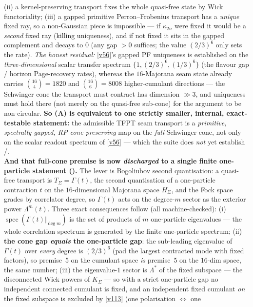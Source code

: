 \documentclass[11pt,a4paper]{article}
\begin{document}
\begin{keybox}
(ii) a kernel-preserving transport fixes the whole quasi-free state by Wick functoriality; (iii) a gapped
primitive Perron--Frobenius transport has a \emph{unique} fixed ray, so a non-Gaussian piece is impossible
--- if $\kappa_{2n}$ were fixed it would be a \emph{second} fixed ray (killing uniqueness), and if not
fixed it sits in the gapped complement and decays to $0$ (any gap $>0$ suffices; the value $(2/3)^6$ only
sets the rate). \emph{The honest residual:} \vref{v56}'s gapped PF uniqueness is established on the
\emph{three-dimensional} scalar transfer spectrum $\{1,(2/3)^6,(1/3)^6\}$ (the flavour gap / horizon
Page-recovery rates), whereas the $16$-Majorana seam state already carries $\binom{16}{4}{=}1820$ and
$\binom{16}{6}{=}8008$ higher-cumulant directions --- the Schwinger cone the transport must contract has
dimension $\gg3$, and uniqueness must hold there (not merely on the quasi-free sub-cone) for the argument
to be non-circular. \textbf{So (A) is equivalent to one strictly smaller, internal, exact-testable
statement:} the admissible TFPT seam transport is a \emph{primitive, spectrally gapped, RP-cone-preserving}
map on the \emph{full} Schwinger cone, not only on the scalar readout spectrum of \vref{v56} --- which the
suite does \emph{not} yet establish \mE/\mO.
\smallskip\\
\noindent\textbf{And that full-cone premise is now \emph{discharged} to a single finite one-particle
statement ().} The lever is Bogoliubov second quantisation: a
quasi-free transport is $T_\Sigma=\Gamma(t)$, the second quantisation of a one-particle contraction $t$ on
the $16$-dimensional Majorana space $H_\Sigma$, and the Fock space grades by correlator degree, so
$\Gamma(t)$ acts on the degree-$m$ sector as the exterior power $\Lambda^m(t)$. Three exact consequences
follow (all machine-checked): (i) $\operatorname{spec}(\Gamma(t)|_{\deg m})$ is the set of products of $m$
one-particle eigenvalues --- the whole correlation spectrum is generated by the finite one-particle
spectrum; (ii) \textbf{the cone gap \emph{equals} the one-particle gap}: the sub-leading eigenvalue of
$\Gamma(t)$ over \emph{every} degree is $(2/3)^6$ (pad the largest contracted mode with fixed factors), so
premise~5 on the cumulant space \emph{is} premise~5 on the $16$-dim space, the same number; (iii) the
eigenvalue-$1$ sector is $\Lambda^{*}$ of the fixed subspace --- the disconnected Wick powers of $K_\Sigma$
--- so with a strict one-particle gap no independent connected cumulant is fixed, and an independent fixed
cumulant \emph{on} the fixed subspace is excluded by \vref{v113} (one polarisation $\Leftrightarrow$ one

\end{keybox}
\end{document}
